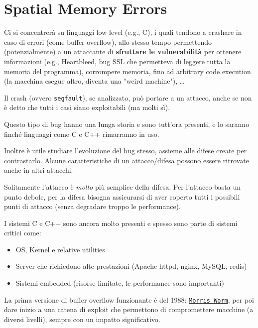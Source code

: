 \section{Spatial Memory Errors}

Ci si concentrerà su linguaggi low level (e.g., C), i quali tendono a crashare in caso di errori (come buffer overflow), allo stesso tempo permettendo (potenzialmente) a un attaccante di \textbf{sfruttare le vulnerabilità} per ottenere informazioni (e.g., Heartbleed, bug SSL che permetteva di leggere tutta la memoria del programma), corrompere memoria, fino ad arbitrary code execution (la macchina esegue altro, diventa una "weird machine"), \dots

Il crash (ovvero \texttt{segfault}), se analizzato, può portare a un attacco, anche se non è detto che tutti i casi siano exploitabili (ma molti sì).

Questo tipo di bug hanno una lunga storia e sono tutt'ora presenti, e lo saranno finché linguaggi come C e C++ rimarranno in uso. 

Inoltre è utile studiare l'evoluzione del bug stesso, assieme alle difese create per contrastarlo. Alcune caratteristiche di un attacco/difesa possono essere ritrovate anche in altri attacchi.

Solitamente l'attacco è \textit{molto} più semplice della difesa. Per l'attacco basta un punto debole, per la difesa bisogna assicurarsi di aver coperto tutti i possibili punti di attacco (senza degradare troppo le performance).

I sistemi C e C++ sono ancora molto presenti e spesso sono parte di sistemi critici come: 
\begin{itemize}
	\item OS, Kernel e relative utilities
    
	\item Server che richiedono alte prestazioni (Apache httpd, nginx, MySQL, redis)
	
    \item Sistemi embedded (risorse limitate, le performance sono importanti)
\end{itemize}

La prima versione di buffer overflow funzionante è del 1988: \href{https://en.wikipedia.org/wiki/Morris_worm}{\texttt{Morris Worm}}, per poi dare inizio a una catena di exploit che permettono di compromettere macchine (a diversi livelli), sempre con un impatto significativo.

